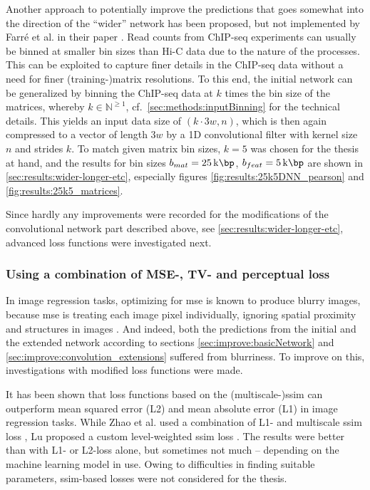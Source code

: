 Another approach to potentially improve the predictions that goes somewhat into
the direction of the ``wider'' network has been proposed, but not implemented by Farr\'e et al. 
in their paper \cite{Farre2018a}.
Read counts from ChIP-seq experiments can usually be binned at smaller bin sizes than Hi-C data due to the nature of 
the processes. 
This can be exploited to capture finer details in the ChIP-seq data without a need for finer (training-)matrix resolutions.
To this end, the initial network can be generalized by binning the ChIP-seq data at $k$ times the bin size of the matrices, 
whereby $k \in \mathbb{N}^{\geq1}$, cf.~\cref{sec:methods:inputBinning} for the technical details.
This yields an input data size of $(k \cdot 3w, n)$, which is then again compressed to a vector of length $3w$ 
by a 1D convolutional filter with kernel size $n$ and strides $k$. 
To match given matrix bin sizes, $k=5$ was chosen for the thesis at hand, 
and the results for bin sizes $b_{mat}=\SI{25}{\kilo\bp}$, $b_{feat}=\SI{5}{\kilo\bp}$ are shown in \cref{sec:results:wider-longer-etc},
especially figures \ref{fig:results:25k5DNN_pearson} and \ref{fig:results:25k5_matrices}.

Since hardly any improvements were recorded for the modifications of the convolutional network part described above, 
see \cref{sec:results:wider-longer-etc}, advanced loss functions were investigated next.

\subsubsection{Using a combination of MSE-, TV- and perceptual loss} \label{sec:improve:combined_loss}
In image regression tasks, optimizing for \acrfull{mse} is known to produce blurry images,
because \acrshort{mse} is treating each image pixel individually, ignoring spatial proximity and structures in images \cite{Isola2017,Lu2019}.
And indeed, both the predictions from the initial and the extended network according to sections \ref{sec:improve:basicNetwork} and \ref{sec:improve:convolution_extensions} 
suffered from blurriness. 
To improve on this, investigations with modified loss functions were made. 

It has been shown that loss functions based on the (multiscale-)\acrfull{ssim} \cite{Wang2003}
can outperform mean squared error (L2) and mean absolute error (L1) in image regression tasks.
While Zhao et al. used a combination of L1- and multiscale \acrshort{ssim} loss \cite{Zhao2017},
Lu proposed a custom level-weighted \acrshort{ssim} loss \cite{Lu2019}.
The results were better than with L1- or L2-loss alone, but sometimes not much -- depending on the machine learning model in use.
Owing to difficulties in finding suitable parameters, \acrshort{ssim}-based losses were not considered for the thesis.

